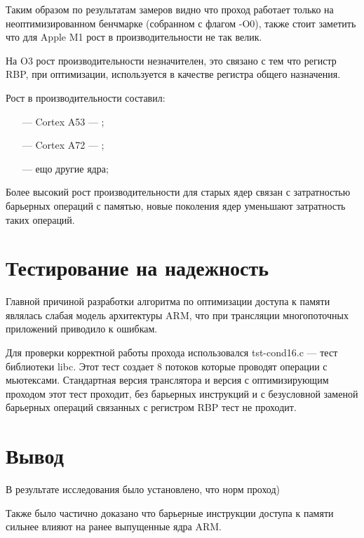 \newpage

Таким образом по результатам замеров видно что проход работает только на неоптимизированном бенчмарке (собранном с флагом -O0), также стоит заметить что для Apple M1 рост в производительности не так велик.

На O3 рост производительности незначителен, это связано с тем что регистр RBP, при оптимизации, используется в качестве регистра общего назначения.

Рост в производительности составил:
\begin{itemize}[leftmargin=1.6\parindent]
	\item[---] Cortex A53 --- ;
	\item[---] Cortex A72 --- ;
	\item[---] ещо другие ядра;
\end{itemize}

Более высокий рост производительности для старых ядер связан с затратностью барьерных операций с памятью, новые поколения ядер уменьшают затратность таких операций.

\section{Тестирование на надежность}

Главной причиной разработки алгоритма по оптимизации доступа к памяти являлась слабая модель архитектуры ARM, что при трансляции многопоточных приложений приводило к ошибкам.

Для проверки корректной работы прохода использовался tst-cond16.c --- тест библиотеки libc. Этот тест создает 8 потоков которые проводят операции с мьютексами. Стандартная версия транслятора и версия с оптимизирующим проходом этот тест проходит, без барьерных инструкций и с безусловной заменой барьерных операций связанных с регистром RBP тест не проходит.

\section{Вывод}

В результате исследования было установлено, что норм проход)

Также было частично доказано что барьерные инструкции доступа к памяти сильнее влияют на ранее выпущенные ядра ARM.